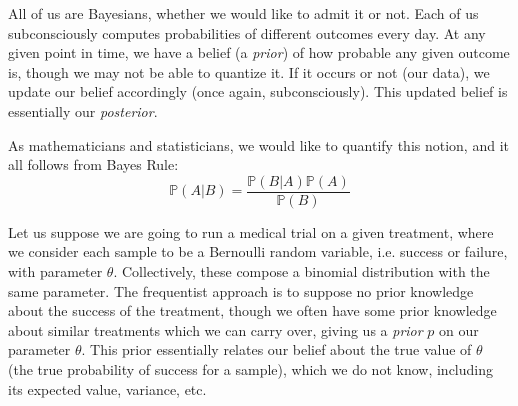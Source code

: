 
All of us are Bayesians, whether we would like to admit it or not. Each of us subconsciously computes probabilities of different outcomes every day. At any given point in time, we have a belief (a \emph{prior}) of how probable any given outcome is, though we may not be able to quantize it. If it occurs or not (our data), we update our belief accordingly (once again, subconsciously). This updated belief is essentially our \emph{posterior}.

As mathematicians and statisticians, we would like to quantify this notion, and it all follows from Bayes Rule:
\begin{equation*}
\mathbb{P}(A | B) = \frac{\mathbb{P}(B | A)\mathbb{P}(A)}{\mathbb{P}(B)}
\end{equation*}

Let us suppose we are going to run a medical trial on a given treatment, where we consider each sample to be a Bernoulli random variable, i.e. success or failure, with parameter $\theta$. Collectively, these compose a binomial distribution with the same parameter. The frequentist approach is to suppose no prior knowledge about the success of the treatment, though we often have some prior knowledge about similar treatments which we can carry over, giving us a \emph{prior} $p$ on our parameter $\theta$. This prior essentially relates our belief about the true value of $\theta$ (the true probability of success for a sample), which we do not know, including its expected value, variance, etc.

